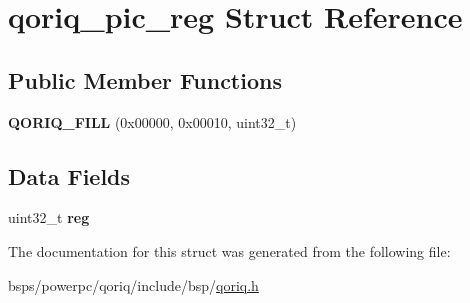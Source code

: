 \hypertarget{structqoriq__pic__reg}{}\section{qoriq\+\_\+pic\+\_\+reg Struct Reference}
\label{structqoriq__pic__reg}
\subsection*{Public Member Functions}
\begin{DoxyCompactItemize}
\item 
\mbox{\label{structqoriq__pic__reg_a6fb1b56002dcd61223457b596947a147}} 
{\bfseries Q\+O\+R\+I\+Q\+\_\+\+F\+I\+LL} (0x00000, 0x00010, uint32\+\_\+t)
\end{DoxyCompactItemize}
\subsection*{Data Fields}
\begin{DoxyCompactItemize}
\item 
\mbox{\label{structqoriq__pic__reg_a4c77be1376bc3135bea3f14bd00ac9fc}} 
uint32\+\_\+t {\bfseries reg}
\end{DoxyCompactItemize}


The documentation for this struct was generated from the following file\+:\begin{DoxyCompactItemize}
\item 
bsps/powerpc/qoriq/include/bsp/\mbox{\hyperlink{qoriq_8h}{qoriq.\+h}}\end{DoxyCompactItemize}
